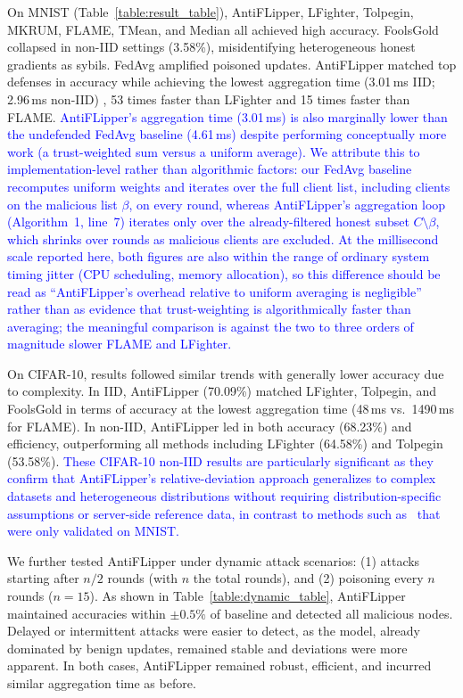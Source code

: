\documentclass[conference]{IEEEtran}
\begin{document}
On MNIST (Table~\ref{table:result_table}), AntiFLipper, LFighter, Tolpegin, MKRUM, FLAME, TMean, and Median all achieved high accuracy. FoolsGold collapsed in non-IID settings (3.58\%), misidentifying heterogeneous honest gradients as sybils. FedAvg amplified poisoned updates. AntiFLipper matched top defenses in accuracy while achieving the lowest aggregation time (3.01\,ms IID; 2.96\,ms non-IID) ,  53 times faster than LFighter and 15 times faster than FLAME. \textcolor{blue}{AntiFLipper's aggregation time (3.01\,ms) is also marginally lower than the undefended FedAvg baseline (4.61\,ms) despite performing conceptually more work (a trust-weighted sum versus a uniform average). We attribute this to implementation-level rather than algorithmic factors: our FedAvg baseline recomputes uniform weights and iterates over the full client list, including clients on the malicious list $\beta$, on every round, whereas AntiFLipper's aggregation loop (Algorithm~1, line~7) iterates only over the already-filtered honest subset $C \setminus \beta$, which shrinks over rounds as malicious clients are excluded. At the millisecond scale reported here, both figures are also within the range of ordinary system timing jitter (CPU scheduling, memory allocation), so this difference should be read as ``AntiFLipper's overhead relative to uniform averaging is negligible'' rather than as evidence that trust-weighting is algorithmically faster than averaging; the meaningful comparison is against the two to three orders of magnitude slower FLAME and LFighter.}

On CIFAR-10, results followed similar trends with generally lower accuracy due to complexity. In IID, AntiFLipper (70.09\%) matched LFighter, Tolpegin, and FoolsGold in terms of accuracy at the lowest aggregation time (48\,ms vs.\ 1490\,ms for FLAME). In non-IID, AntiFLipper led in both accuracy (68.23\%) and efficiency, outperforming all methods including LFighter (64.58\%) and Tolpegin (53.58\%). \textcolor{blue}{These CIFAR-10 non-IID results are particularly significant as they confirm that AntiFLipper's relative-deviation approach generalizes to complex datasets and heterogeneous distributions without requiring distribution-specific assumptions or server-side reference data, in contrast to methods such as~\cite{li2023hscs,shen2024lfrppfl} that were only validated on MNIST.}

We further tested AntiFLipper under dynamic attack scenarios: (1) attacks starting after $n/2$ rounds (with $n$ the total rounds), and (2) poisoning every $n$ rounds ($n=15$). As shown in Table~\ref{table:dynamic_table}, AntiFLipper maintained accuracies within $\pm0.5\%$ of baseline and detected all malicious nodes. Delayed or intermittent attacks were easier to detect, as the model, already dominated by benign updates, remained stable and deviations were more apparent. In both cases, AntiFLipper remained robust, efficient, and incurred similar aggregation time as before.
\end{document}
